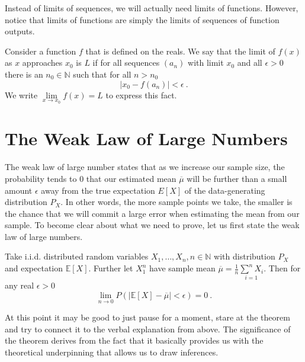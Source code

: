 Instead of limits of sequences, we will actually need limits of functions. However, notice that limits of functions are simply the limits of sequences of function
outputs. 

\begin{Definition}
Consider a function $ f $ that is defined on the reals. We say that the limit of $ f(x) $ as $ x $ approaches $ x_{0} $ is $ L $ if for all sequences 
$ \left( a_{n} \right) $ with limit $ x_{0} $ and all $ \epsilon > 0 $ there is an $ n_{0} \in \mathbb{N} $ such that for all $ n > n_{0} $ 
$$  | x_{0} - f\left(a_{n}\right) | < \epsilon \ .$$
We write $ \underset{x \rightarrow x_{0}}{\lim} f(x) = L $ to express this fact. \\
\end{Definition}

\section{The Weak Law of Large Numbers}\label{LawOfLargeNumbers}
The weak law of large number states that as we increase our sample size, the probability tends to 0 that our estimated mean $ \overline{\mu} $ will be further than a small
amount $ \epsilon $ away from the true expectation $ E[X] $ of the data-generating distribution $ P_{X} $. In other words, the more sample points we take, 
the smaller is the chance that we will commit a large error when estimating the mean from our sample. To become clear about what we need to prove, let us first state
the weak law of large numbers.

\begin{Theorem}\label{weakLaw}
Take i.i.d. distributed random variables $ X_{1}, \ldots, X_{n}, n \in \mathbb{N} $ with distribution $ P_{X} $ and expectation $ \mathbb{E}[X] $. Further let
$ X_{1}^{n} $ have sample mean $ \overline{\mu} = \frac{1}{n} \underset{i=1}{\overset{n}{\sum}X_{i}} $. Then for any real $ \epsilon > 0 $
$$ \underset{n \rightarrow 0}{\lim}P(|\mathbb{E}[X] - \overline{\mu}| < \epsilon) = 0 \ . $$
\end{Theorem}

At this point it may be good to just pause for a moment, stare at the theorem and try to connect it to the verbal explanation from above. The significance of the theorem
derives from the fact that it basically provides us with the theoretical underpinning that allows us to draw inferences.

